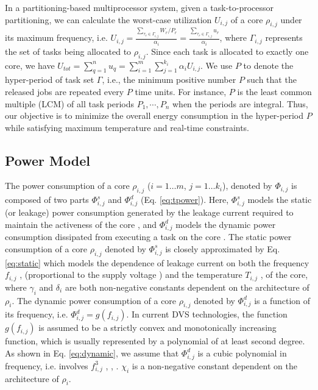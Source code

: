 \documentclass[conference]{IEEEtran}
\begin{document}
%
%
In a partitioning-based multiprocessor system, given a task-to-processor partitioning, we can calculate the worst-case utilization $U_{i,j}$ of a core $\rho_{i,j}$ under its maximum frequency, i.e. $U_{i,j}=\frac{\sum_{\tau_r \in  \Gamma_{i,j}} W_r/P_r}{\alpha_i}=\frac{\sum_{\tau_r \in  \Gamma_{i,j}} u_r}{\alpha_i}$, where $\Gamma_{i,j}$ represents the set of tasks being allocated to $\rho_{i,j}$. Since each task is allocated to exactly one core, we have $U_{tot} = \sum_{q=1}^{n} u_q = \sum_{i=1}^{m} \sum_{j=1}^{k_i} \alpha_i U_{i,j}$.
We use $P$ to denote the hyper-period of task set $\Gamma$, i.e., the minimum positive number $P$ such that the released jobs are repeated every $P$ time units. For instance, $P$ is the least common multiple (LCM) of all task periods $P_1, \cdots, P_n$ when the periods are integral. 
Thus, our objective is to minimize the overall energy consumption in the hyper-period $P$ while satisfying maximum temperature and real-time constraints.

\subsection{Power Model}
\label{power-model}

The power consumption of a core $\rho_{i,j}$  ($i=1\ldots m$, $j=1\ldots k_i$), denoted by $\Phi_{i,j}$ is composed of two 
parts $\Phi^{s}_{i,j}$ and $\Phi^{d}_{i,j}$ (Eq. \ref{eq:tpower}). Here, $\Phi^{s}_{i,j}$ models the static 
(or leakage) power consumption
generated by the leakage current required to maintain the activeness of the core \cite{Chen09,Langen06}, and
$\Phi^{d}_{i,j}$ models the dynamic power 
consumption dissipated from executing a task on the core \cite{Aydin03}. 
The static power consumption of a core $\rho_{i,j}$ denoted by  $\Phi^{s}_{i,j}$
is closely approximated  by Eq. \ref{eq:static} which models the dependence of leakage current on both the frequency $f_{i,j}$
\cite{Chantem10}, \cite{Fisher09} (proportional to the supply voltage \cite{Chaturvedi10})
and the temperature $T_{i,j}$ \cite{Quan10}, \cite{Chaturvedi10} of the core, 
where $\gamma_i$ and $\delta_i$ are both non-negative constants dependent on the architecture of $\rho_i$. The dynamic power consumption of a core $\rho_{i,j}$ denoted by  $\Phi^{d}_{i,j}$
is a function of its frequency, i.e. $\Phi^{d}_{i,j} = g(f_{i,j})$. 
In current DVS technologies, the function $g(f_{i,j})$ is assumed to be a strictly convex and monotonically increasing function, 
which is usually represented by a polynomial of at least second degree.
As shown in Eq. \ref{eq:dynamic}, we assume that $\Phi^{d}_{i,j}$ is a cubic polynomial in frequency, i.e. involves $f_{i,j}^3$ 
\cite{Chantem10}, \cite{Quan10}, \cite{Fisher09}.
$\chi_i$ is a non-negative constant
dependent on the architecture of $\rho_i$.
 
\end{document}
